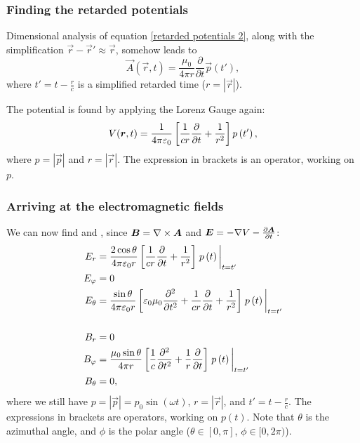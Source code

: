     \subsubsection*{Finding the retarded potentials}
        Dimensional analysis of equation \eqref{retarded potentials 2}, along with the simplification $\vec{r} - \vec{r}' \approx \vec{r}$, 
        somehow leads to 
        \begin{equation}
            \vec{A}\left(\vec{r}, t\right) = \frac{\mu_0}{4\pi r} \frac{\partial }{\partial t}\vec{p}\left(t'\right),
        \end{equation} 
        where $t' = t - \frac{{r}}{c}$ is a simplified retarded time ($r = |\vec{r}|$).

        The potential is found by applying the Lorenz Gauge again:
        \begin{equation}
            V(\bm{r}, t) = \frac{1}{4\pi\varepsilon_0}
            \left[\frac{1}{cr}\frac{\partial}{\partial t} + \frac{1}{r^2} \right]
            p\left(t'\right),
        \end{equation}
        where $p = |\vec{p}|$ and $r = |\vec{r}|$. The expression in brackets is an operator, working on $p$.

    \subsubsection*{Arriving at the electromagnetic fields}
        We can now find \B{} and \E, since $\bm{B} = \nabla\times\bm{A}$ and $\bm{E} = -\nabla V - \frac{\partial\bm{A}}{\partial t}$:
        \begin{align*}
            E_r &= \frac{2\cos\theta}{4\pi\e r}\left[\frac{1}{cr}\frac{\partial}{\partial t} + \frac{1}{r^2}\right]
                    \eval{p\left(t\right)}_{t=t'}\\
            E_\phi &= 0 \\
            E_\theta &= \frac{\sin\theta}{4\pi\e r}\left[\e\mu_0\frac{\partial^2}{\partial t^2} 
                    + \frac{1}{cr}\frac{\partial}{\partial t} + \frac{1}{r^2}\right]
                    \eval{p\left(t\right)}_{t=t'}\\
            &\\
            B_r &= 0 \\
            B_\phi &= \frac{\mu_0 \sin\theta}{4\pi r}\left[\frac{1}{c}\frac{\partial^2}{\partial t^2} + \frac{1}{r}\frac{\partial}{\partial t}\right]
                \eval{p\left(t\right)}_{t=t'}\\
            B_\theta &= 0,
        \end{align*}
        where we still have $p = |\vec{p}| = p_0\sin\left(\omega t\right)$, $r = |\vec{r}|$, and $t' = t - \frac{{r}}{c}$. 
        The expressions in brackets are operators, working on $p(t)$. Note that $\theta$ is the azimuthal angle, and $\phi$ is the polar angle
        ($\theta \in [0, \pi]$, $\phi \in [0, 2\pi)$).

